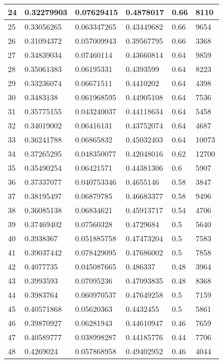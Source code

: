 \begin{longtable}{|l|l|l|l|l|l|}
24 & 0.32279903 & 0.07629415 & 0.4878017 & 0.66 & 8110 \\ \hline 
25 & 0.33056265 & 0.063347265 & 0.43449682 & 0.66 & 9654 \\ \hline 
26 & 0.31094372 & 0.057009943 & 0.39567795 & 0.66 & 3368 \\ \hline 
27 & 0.34839034 & 0.07460114 & 0.43660814 & 0.64 & 9859 \\ \hline 
28 & 0.35061383 & 0.06195331 & 0.4393599 & 0.64 & 8223 \\ \hline 
29 & 0.33236074 & 0.06671511 & 0.4410202 & 0.64 & 4398 \\ \hline 
30 & 0.3483138 & 0.061968595 & 0.44905108 & 0.64 & 7536 \\ \hline 
31 & 0.35775155 & 0.043240037 & 0.44118634 & 0.64 & 5458 \\ \hline 
32 & 0.34019002 & 0.06416131 & 0.43752074 & 0.64 & 4687 \\ \hline 
33 & 0.36241788 & 0.06865832 & 0.45032403 & 0.64 & 10073 \\ \hline 
34 & 0.37265295 & 0.048350077 & 0.42048016 & 0.62 & 12700 \\ \hline 
35 & 0.35490254 & 0.06421571 & 0.44381306 & 0.6 & 5907 \\ \hline 
36 & 0.37337077 & 0.040753346 & 0.4655146 & 0.58 & 3847 \\ \hline 
37 & 0.38195497 & 0.06879785 & 0.46683377 & 0.58 & 9496 \\ \hline 
38 & 0.36085138 & 0.06834621 & 0.45913717 & 0.54 & 4706 \\ \hline 
39 & 0.37469402 & 0.07560328 & 0.4729684 & 0.5 & 5640 \\ \hline 
40 & 0.3938367 & 0.051885758 & 0.47473204 & 0.5 & 7583 \\ \hline 
41 & 0.39037442 & 0.078429095 & 0.47686002 & 0.5 & 7858 \\ \hline 
42 & 0.4077735 & 0.045087665 & 0.486337 & 0.48 & 3964 \\ \hline 
43 & 0.3993593 & 0.07095236 & 0.47093835 & 0.48 & 8368 \\ \hline 
44 & 0.3983764 & 0.060970537 & 0.47649258 & 0.5 & 7159 \\ \hline 
45 & 0.40571868 & 0.05620363 & 0.4432455 & 0.5 & 5861 \\ \hline 
46 & 0.39870927 & 0.06281943 & 0.44610947 & 0.46 & 7659 \\ \hline 
47 & 0.40589777 & 0.038998287 & 0.44185776 & 0.44 & 7706 \\ \hline 
48 & 0.4269024 & 0.057868958 & 0.49402952 & 0.46 & 4044 \\ \hline 

\end{longtable}
